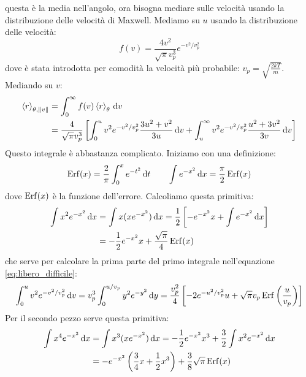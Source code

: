 questa è la media nell'angolo, ora bisogna mediare sulle velocità usando la distribuzione delle velocità di Maxwell. Mediamo su $u$ usando la distribuzione delle velocità:
\[
	f(v)=\frac{4v^2}{\sqrt{\pi}v_p^3} e^{-v^2/v_p^2}
\]
dove è stata introdotta per comodità la velocità più probabile: $v_p=\sqrt{\frac{2kT}{m}}$. Mediando su $v$:
\begin{equation}
	\label{eq:libero_difficile}
	\begin{aligned}
		\left<r\right>_{\theta,\left\lVert v\right\rVert} & = \int_0^\infty f(v) \left<r\right>_\theta\,\mathrm{d} v                                                                                                               \\
		                            & = \frac{4}{\sqrt{\pi}v_p^3} \left[\int_0^u v^2 e^{-v^2/v_p^2}\frac{3u^2+v^2}{3u}\,\mathrm{d} v+ \int_u^\infty v^2 e^{-v^2/v_p^2}\frac{u^2+3v^2}{3v}\,\mathrm{d} v\right]
	\end{aligned}
\end{equation}
Questo integrale è abbastanza complicato. Iniziamo con una definizione:
\begin{equation}
	\operatorname{Erf}(x) = \frac{2}{\pi}\int_0^x e^{-t^2}\,\mathrm{d} t\qquad \int e^{-x^2}\,\mathrm{d} x = \frac{\pi}{2}\operatorname{Erf}(x)
\end{equation}
dove $\operatorname{Erf}(x)$ è la funzione dell'errore. Calcoliamo questa primitiva:
\begin{equation}
	\begin{aligned}
		\int x^2 e^{-x^2}\,\mathrm{d} x & = \int x (x e^{-x^2})\,\mathrm{d} x = \frac{1}{2}\left[-e^{-x^2} x + \int e^{-x^2}\,\mathrm{d} x\right] \\
		                         & = -\frac{1}{2}e^{-x^2}x+\frac{\sqrt{\pi}}{4}\operatorname{Erf}(x)
	\end{aligned}
\end{equation}
che serve per calcolare la prima parte del primo integrale nell'equazione \ref{eq:libero_difficile}:
\begin{equation}
	\int_0^u v^2 e^{-v^2/v_p^2}\,\mathrm{d} v =
	v_p^3\int_0^{u/v_p} y^2 e^{-y^2}\,\mathrm{d} y =
	\frac{v_p^2}{4}\left[-2 e^{-u^2/v_p^2} u+\sqrt{\pi}v_p\operatorname{Erf}\left(\frac{u}{v_p}\right)\right]
\end{equation}
Per il secondo pezzo serve questa primitiva:
\begin{equation}
	\begin{aligned}
		\int x^4 e^{-x^2}\,\mathrm{d} x & = \int x^3 (x e^{-x^2})\,\mathrm{d} x = -\frac{1}{2}e^{-x^2} x^3 + \frac{3}{2}\int x^2 e^{-x^2}\,\mathrm{d} x \\
		                         & = -e^{-x^2}\left(\frac{3}{4}x + \frac{1}{2}x^3\right) + \frac{3}{8}\sqrt{\pi}\operatorname{Erf}(x)
	\end{aligned}
\end{equation}
